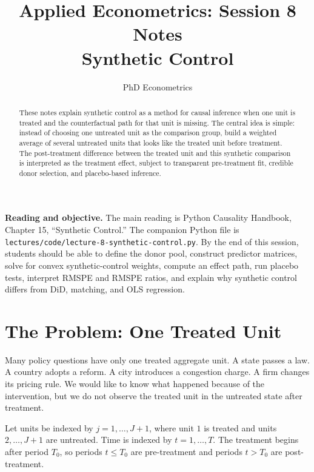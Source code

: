 

\title{Applied Econometrics: Session 8 Notes\\Synthetic Control}
\author{PhD Econometrics}
\date{}


\maketitle

\begin{abstract}
These notes explain synthetic control as a method for causal inference when one unit is treated and the counterfactual path for that unit is missing. The central idea is simple: instead of choosing one untreated unit as the comparison group, build a weighted average of several untreated units that looks like the treated unit before treatment. The post-treatment difference between the treated unit and this synthetic comparison is interpreted as the treatment effect, subject to transparent pre-treatment fit, credible donor selection, and placebo-based inference.
\end{abstract}

\begin{boxD}
\textbf{Reading and objective.} The main reading is Python Causality Handbook, Chapter 15, ``Synthetic Control.'' The companion Python file is \texttt{lectures/code/lecture-8-synthetic-control.py}. By the end of this session, students should be able to define the donor pool, construct predictor matrices, solve for convex synthetic-control weights, compute an effect path, run placebo tests, interpret RMSPE and RMSPE ratios, and explain why synthetic control differs from DiD, matching, and OLS regression.
\end{boxD}

\section{The Problem: One Treated Unit}

Many policy questions have only one treated aggregate unit. A state passes a law. A country adopts a reform. A city introduces a congestion charge. A firm changes its pricing rule. We would like to know what happened because of the intervention, but we do not observe the treated unit in the untreated state after treatment.

Let units be indexed by \(j=1,\ldots,J+1\), where unit \(1\) is treated and units \(2,\ldots,J+1\) are untreated. Time is indexed by \(t=1,\ldots,T\). The treatment begins after period \(T_0\), so periods \(t\leq T_0\) are pre-treatment and periods \(t>T_0\) are post-treatment.

